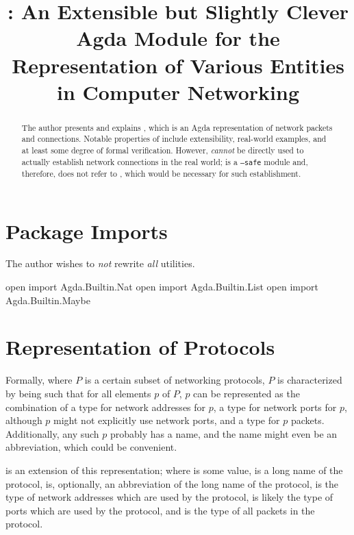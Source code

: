 \documentclass{article}
\title{\AgdaModule{Network}: An Extensible but Slightly Clever Agda Module for the Representation of Various Entities in Computer Networking}
\begin{document}
\maketitle{}

\begin{abstract}
The author presents and explains , which is an Agda representation of network packets and connections.  Notable properties of  include extensibility, real-world examples, and at least some degree of formal verification.  However,  \emph{cannot} be directly used to actually establish network connections in the real world;  is a \texttt{--safe} module and, therefore, does not refer to , which would be necessary for such establishment.
\end{abstract}

\section{Package Imports}
The author wishes to \emph{not} rewrite \emph{all} utilities.

\begin{code}
open import Agda.Builtin.Nat
open import Agda.Builtin.List
open import Agda.Builtin.Maybe
\end{code}

\section{Representation of Protocols}
Formally, where \(P\) is a certain subset of networking protocols, \(P\) is characterized by being such that for all elements \(p\) of \(P\), \(p\) can be represented as the combination of a type for network addresses for \(p\), a type for network ports for \(p\), although \(p\) might not explicitly use network ports, and a type for \(p\) packets.  Additionally, any such \(p\) probably has a name, and the name might even be an abbreviation, which could be convenient.

 is an extension of this representation; where  is some  value,   is a long name of the  protocol,   is, optionally, an abbreviation of the long name of the  protocol,   is the type of network addresses which are used by the  protocol,   is likely the type of ports which are used by the  protocol, and   is the type of all packets in the  protocol.
\end{document}
